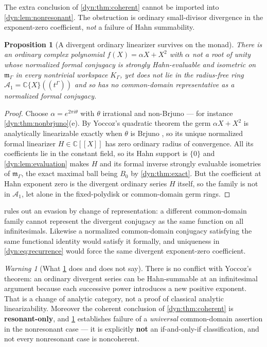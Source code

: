 \documentclass[11pt,letterpaper]{article}
\newtheorem{proposition}[proposition]{Proposition}
\theoremstyle{definition}
\theoremstyle{remark}
\newtheorem{warning}[warning]{Warning}
\newcommand{\C}{\mathbb C}
\newcommand{\m}{\mathfrak m}
\numberwithin{equation}{section}
\begin{document}
The extra conclusion of \cref{dyn:thm:coherent} cannot be imported into
\cref{dyn:lem:nonresonant}. The obstruction is ordinary small-divisor
divergence in the exponent-zero coefficient, \emph{not} a failure of Hahn
summability.

\begin{proposition}[A divergent ordinary linearizer survives on the monad]
\label{dyn:prop:noncoherent}
There is an ordinary complex polynomial $f(X)=\alpha X+X^{2}$ with $\alpha$
not a root of unity whose normalized formal conjugacy is strongly
Hahn-evaluable and isometric on $\m_\Gamma$ in \emph{every} nontrivial
workspace $K_\Gamma$, yet does not lie in the radius-free ring
$\mathcal A_1=\C\{X\}((t^{\Gamma}))$ and so has no common-domain
representative as a normalized formal conjugacy.
\end{proposition}
\begin{proof}
Choose $\alpha=e^{2\pi i\theta}$ with $\theta$ irrational and non-Brjuno
--- for instance \cref{dyn:thm:nonbrjuno}(e). By Yoccoz's quadratic theorem
the germ $\alpha X+X^{2}$ is analytically linearizable exactly when
$\theta$ is Brjuno \cite{Yoccoz}, so its unique normalized formal
linearizer $H\in\C[[X]]$ has zero ordinary radius of convergence. All its
coefficients lie in the constant field, so its Hahn support is $\{0\}$ and
\cref{dyn:lem:evaluation} makes $H$ and its formal inverse strongly
evaluable isometries of $\m_\Gamma$, the exact maximal ball being $B_0$ by
\cref{dyn:thm:exact}. But the coefficient at Hahn exponent zero is the
divergent ordinary series $H$ itself, so the family is not in
$\mathcal A_1$, let alone in the fixed-polydisk or common-domain germ
rings.
\end{proof}

 rules out an evasion by change of representation: a
different common-domain family cannot represent the divergent conjugacy as
the same function on all infinitesimals. Likewise a normalized
common-domain conjugacy satisfying the same functional identity would
satisfy it formally, and uniqueness in \eqref{dyn:eq:recurrence} would
force the same divergent exponent-zero coefficient.

\begin{warning}[What \cref{dyn:prop:noncoherent} does and does not say]
\label{dyn:warn:noncoherent}
There is no conflict with Yoccoz's theorem: an ordinary divergent series can
be Hahn-summable at an infinitesimal argument because each successive power
introduces a new positive exponent. That is a change of analytic category,
not a proof of classical analytic linearizability. Moreover the coherent
conclusion of \cref{dyn:thm:coherent} is \textbf{resonant-only}, and
\cref{dyn:prop:noncoherent} establishes failure of a \emph{universal}
common-domain assertion in the nonresonant case --- it is explicitly
\textbf{not} an if-and-only-if classification, and not every nonresonant
case is noncoherent.
\end{warning}
\end{document}

